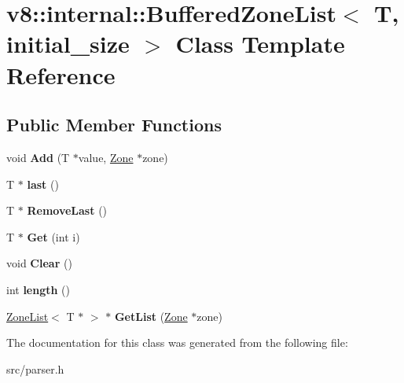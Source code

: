 \hypertarget{classv8_1_1internal_1_1_buffered_zone_list}{}\section{v8\+:\+:internal\+:\+:Buffered\+Zone\+List$<$ T, initial\+\_\+size $>$ Class Template Reference}
\label{classv8_1_1internal_1_1_buffered_zone_list}
\subsection*{Public Member Functions}
\begin{DoxyCompactItemize}
\item 
\hypertarget{classv8_1_1internal_1_1_buffered_zone_list_a3de4c84270cb42702572ced51d30d26f}{}void {\bfseries Add} (T $\ast$value, \hyperlink{classv8_1_1internal_1_1_zone}{Zone} $\ast$zone)\label{classv8_1_1internal_1_1_buffered_zone_list_a3de4c84270cb42702572ced51d30d26f}

\item 
\hypertarget{classv8_1_1internal_1_1_buffered_zone_list_acc8665e024d0570dfef2847261822236}{}T $\ast$ {\bfseries last} ()\label{classv8_1_1internal_1_1_buffered_zone_list_acc8665e024d0570dfef2847261822236}

\item 
\hypertarget{classv8_1_1internal_1_1_buffered_zone_list_a1f06b478c7304885877438e715bf9305}{}T $\ast$ {\bfseries Remove\+Last} ()\label{classv8_1_1internal_1_1_buffered_zone_list_a1f06b478c7304885877438e715bf9305}

\item 
\hypertarget{classv8_1_1internal_1_1_buffered_zone_list_a3101d8115fdbd13dee7caa1d9bdcde63}{}T $\ast$ {\bfseries Get} (int i)\label{classv8_1_1internal_1_1_buffered_zone_list_a3101d8115fdbd13dee7caa1d9bdcde63}

\item 
\hypertarget{classv8_1_1internal_1_1_buffered_zone_list_aa6708f8a2bfc60b2e4fc53868519ff49}{}void {\bfseries Clear} ()\label{classv8_1_1internal_1_1_buffered_zone_list_aa6708f8a2bfc60b2e4fc53868519ff49}

\item 
\hypertarget{classv8_1_1internal_1_1_buffered_zone_list_ab563a66475d19eae0dbf063c3e3f928a}{}int {\bfseries length} ()\label{classv8_1_1internal_1_1_buffered_zone_list_ab563a66475d19eae0dbf063c3e3f928a}

\item 
\hypertarget{classv8_1_1internal_1_1_buffered_zone_list_a0b4985b4ddc528e77143003a03afabae}{}\hyperlink{classv8_1_1internal_1_1_zone_list}{Zone\+List}$<$ T $\ast$ $>$ $\ast$ {\bfseries Get\+List} (\hyperlink{classv8_1_1internal_1_1_zone}{Zone} $\ast$zone)\label{classv8_1_1internal_1_1_buffered_zone_list_a0b4985b4ddc528e77143003a03afabae}

\end{DoxyCompactItemize}


The documentation for this class was generated from the following file\+:\begin{DoxyCompactItemize}
\item 
src/parser.\+h\end{DoxyCompactItemize}
